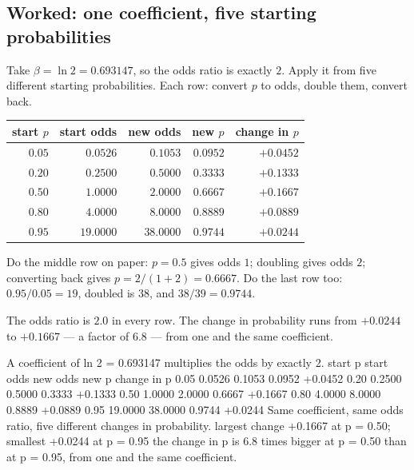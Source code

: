 \documentclass[11pt]{article}
\begin{document}
\subsection{Worked: one coefficient, five starting probabilities}
\label{sec:orworked}

\begin{worked}
Take $\beta = \ln 2 = 0.693147$, so the odds ratio is exactly $2$. Apply it
from five different starting probabilities. Each row: convert $p$ to odds,
double them, convert back.
\begin{center}
\begin{tabular}{@{}rrrrr@{}}
\toprule
start $p$ & start odds & new odds & new $p$ & change in $p$\\
\midrule
$0.05$ & $0.0526$ & $0.1053$ & $0.0952$ & $+0.0452$\\
$0.20$ & $0.2500$ & $0.5000$ & $0.3333$ & $+0.1333$\\
$0.50$ & $1.0000$ & $2.0000$ & $0.6667$ & $\mathbf{+0.1667}$\\
$0.80$ & $4.0000$ & $8.0000$ & $0.8889$ & $+0.0889$\\
$0.95$ & $19.0000$ & $38.0000$ & $0.9744$ & $\mathbf{+0.0244}$\\
\bottomrule
\end{tabular}
\end{center}
Do the middle row on paper: $p = 0.5$ gives odds $1$; doubling gives odds $2$;
converting back gives $p = 2/(1+2) = 0.6667$. Do the last row too:
$0.95/0.05 = 19$, doubled is $38$, and $38/39 = 0.9744$.

The odds ratio is $2.0$ in every row. The change in probability runs from
$+0.0244$ to $+0.1667$ --- a factor of $6.8$ --- from one and the same
coefficient.
\end{worked}

\begin{codeout}
A coefficient of ln 2 = 0.693147 multiplies the odds by exactly 2.
 start p    start odds   new odds    new p      change in p
   0.05        0.0526     0.1053    0.0952      +0.0452
   0.20        0.2500     0.5000    0.3333      +0.1333
   0.50        1.0000     2.0000    0.6667      +0.1667
   0.80        4.0000     8.0000    0.8889      +0.0889
   0.95       19.0000    38.0000    0.9744      +0.0244
Same coefficient, same odds ratio, five different changes in probability.
largest change +0.1667 at p = 0.50;  smallest +0.0244 at p = 0.95
the change in p is 6.8 times bigger at p = 0.50 than at p = 0.95,
from one and the same coefficient.
\end{codeout}
\end{document}
